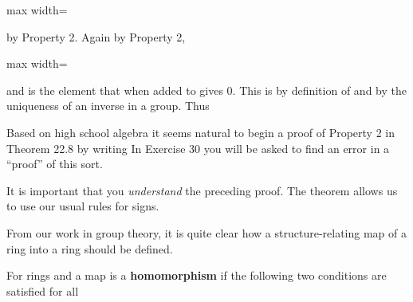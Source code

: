 \documentclass[11pt,oneside]{article}
\begin{document}
\begin{BookBody}
\begin{center}\begin{adjustbox}{max width=\linewidth}\end{adjustbox}\end{center}

\noindent by Property 2. Again by Property 2,

\begin{center}\begin{adjustbox}{max width=\linewidth}\end{adjustbox}\end{center}

\noindent and  is the element that when added to  gives 0. This is  by definition of  and by the uniqueness of an inverse in a group. Thus\BookEnd{\blacklozenge}

Based on high school algebra it seems natural to begin a proof of Property 2 in Theorem 22.8 by writing  In Exercise 30 you will be asked to find an error in a “proof” of this sort.

It is important that you\textit{ understand} the preceding proof. The theorem allows us to use our usual rules for signs.


\noindent From our work in group theory, it is quite clear how a structure-relating map of a ring  into a ring  should be defined.

 For rings  and  a map  is a\textbf{ homomorphism} if the following two conditions are satisfied for all 


 \BookEnd{\blacksquare}


\end{BookBody}
\end{document}
